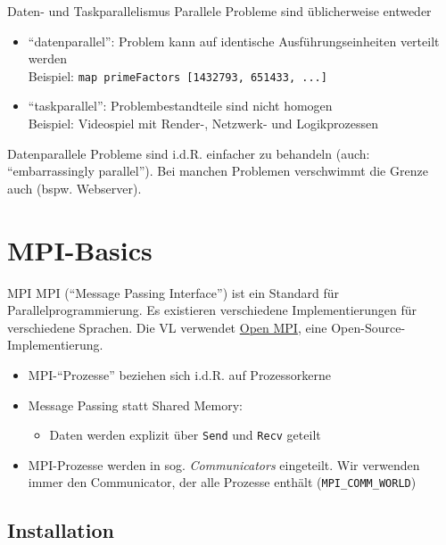 \documentclass{beamer}
\begin{document}
\begin{frame}{Daten- und Taskparallelismus}
	Parallele Probleme sind üblicherweise entweder
	
	\begin{itemize}
		\item \enquote{datenparallel}: Problem kann auf identische Ausführungseinheiten verteilt werden\\
			Beispiel: \texttt{map primeFactors [1432793, 651433, ...]}

		\item \enquote{taskparallel}: Problembestandteile sind nicht homogen\\
			Beispiel: Videospiel mit Render-, Netzwerk- und Logikprozessen
	\end{itemize}

	Datenparallele Probleme sind i.d.R. einfacher zu behandeln (auch: \enquote{embarrassingly parallel}).
	Bei manchen Problemen verschwimmt die Grenze auch (bspw. Webserver).
\end{frame}

\section{MPI-Basics}

\begin{frame}{MPI}
	MPI (\enquote{Message Passing Interface}) ist ein Standard für Parallelprogrammierung.
	Es existieren verschiedene Implementierungen für verschiedene Sprachen.
	Die VL verwendet \href{https://www.open-mpi.org/}{Open MPI}, eine Open-Source-Implementierung.

	\begin{itemize}
		\item MPI-\enquote{Prozesse} beziehen sich i.d.R. auf Prozessorkerne
		\item Message Passing statt Shared Memory:
		\begin{itemize}
			\item Daten werden explizit über \texttt{Send} und \texttt{Recv} geteilt
		\end{itemize}
		\item MPI-Prozesse werden in sog. \emph{Communicators} eingeteilt. Wir verwenden immer den Communicator, der alle Prozesse enthält (\texttt{MPI\_COMM\_WORLD})
	\end{itemize}
\end{frame}

\subsection{Installation}
\end{document}
